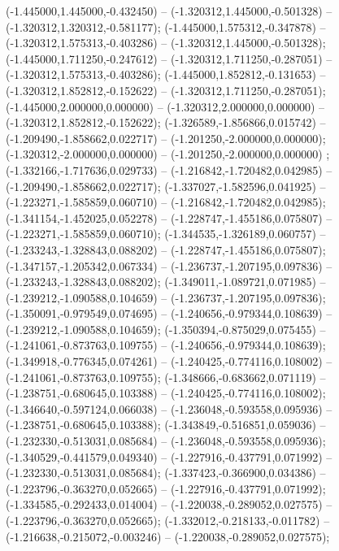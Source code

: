  (-1.445000,1.445000,-0.432450) -- (-1.320312,1.445000,-0.501328) -- (-1.320312,1.320312,-0.581177);
 (-1.445000,1.575312,-0.347878) -- (-1.320312,1.575313,-0.403286) -- (-1.320312,1.445000,-0.501328);
 (-1.445000,1.711250,-0.247612) -- (-1.320312,1.711250,-0.287051) -- (-1.320312,1.575313,-0.403286);
 (-1.445000,1.852812,-0.131653) -- (-1.320312,1.852812,-0.152622) -- (-1.320312,1.711250,-0.287051);
 (-1.445000,2.000000,0.000000) -- (-1.320312,2.000000,0.000000) -- (-1.320312,1.852812,-0.152622);
 (-1.326589,-1.856866,0.015742) -- (-1.209490,-1.858662,0.022717) -- (-1.201250,-2.000000,0.000000);
 (-1.320312,-2.000000,0.000000) -- (-1.201250,-2.000000,0.000000) ;
 (-1.332166,-1.717636,0.029733) -- (-1.216842,-1.720482,0.042985) -- (-1.209490,-1.858662,0.022717);
 (-1.337027,-1.582596,0.041925) -- (-1.223271,-1.585859,0.060710) -- (-1.216842,-1.720482,0.042985);
 (-1.341154,-1.452025,0.052278) -- (-1.228747,-1.455186,0.075807) -- (-1.223271,-1.585859,0.060710);
 (-1.344535,-1.326189,0.060757) -- (-1.233243,-1.328843,0.088202) -- (-1.228747,-1.455186,0.075807);
 (-1.347157,-1.205342,0.067334) -- (-1.236737,-1.207195,0.097836) -- (-1.233243,-1.328843,0.088202);
 (-1.349011,-1.089721,0.071985) -- (-1.239212,-1.090588,0.104659) -- (-1.236737,-1.207195,0.097836);
 (-1.350091,-0.979549,0.074695) -- (-1.240656,-0.979344,0.108639) -- (-1.239212,-1.090588,0.104659);
 (-1.350394,-0.875029,0.075455) -- (-1.241061,-0.873763,0.109755) -- (-1.240656,-0.979344,0.108639);
 (-1.349918,-0.776345,0.074261) -- (-1.240425,-0.774116,0.108002) -- (-1.241061,-0.873763,0.109755);
 (-1.348666,-0.683662,0.071119) -- (-1.238751,-0.680645,0.103388) -- (-1.240425,-0.774116,0.108002);
 (-1.346640,-0.597124,0.066038) -- (-1.236048,-0.593558,0.095936) -- (-1.238751,-0.680645,0.103388);
 (-1.343849,-0.516851,0.059036) -- (-1.232330,-0.513031,0.085684) -- (-1.236048,-0.593558,0.095936);
 (-1.340529,-0.441579,0.049340) -- (-1.227916,-0.437791,0.071992) -- (-1.232330,-0.513031,0.085684);
 (-1.337423,-0.366900,0.034386) -- (-1.223796,-0.363270,0.052665) -- (-1.227916,-0.437791,0.071992);
 (-1.334585,-0.292433,0.014004) -- (-1.220038,-0.289052,0.027575) -- (-1.223796,-0.363270,0.052665);
 (-1.332012,-0.218133,-0.011782) -- (-1.216638,-0.215072,-0.003246) -- (-1.220038,-0.289052,0.027575);
